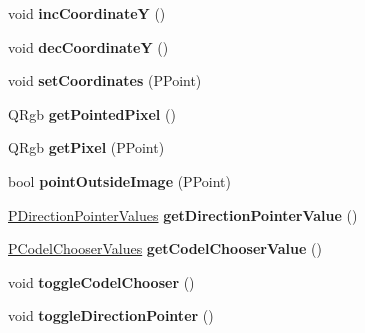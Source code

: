 \begin{CompactItemize}
\item 
\hypertarget{classPCodePointer_58c15d4d1abb1fb971170f19c3b9e8cf}{
void \textbf{incCoordinateY} ()}
\label{classPCodePointer_58c15d4d1abb1fb971170f19c3b9e8cf}

\item 
\hypertarget{classPCodePointer_cc8b95bb3786748c1aff41eed6d299e1}{
void \textbf{decCoordinateY} ()}
\label{classPCodePointer_cc8b95bb3786748c1aff41eed6d299e1}

\item 
\hypertarget{classPCodePointer_117bf9322b4fdcb189c41a6f2f113a4b}{
void \textbf{setCoordinates} (PPoint)}
\label{classPCodePointer_117bf9322b4fdcb189c41a6f2f113a4b}

\item 
\hypertarget{classPCodePointer_6544ee43112dcafb5fc7c865ced682f0}{
QRgb \textbf{getPointedPixel} ()}
\label{classPCodePointer_6544ee43112dcafb5fc7c865ced682f0}

\item 
\hypertarget{classPCodePointer_e9f3396a98b84d090e820ad37c6dca21}{
QRgb \textbf{getPixel} (PPoint)}
\label{classPCodePointer_e9f3396a98b84d090e820ad37c6dca21}

\item 
\hypertarget{classPCodePointer_a9e836354b61f96ed39208c8b37d57d3}{
bool \textbf{pointOutsideImage} (PPoint)}
\label{classPCodePointer_a9e836354b61f96ed39208c8b37d57d3}

\item 
\hypertarget{classPCodePointer_e0461a3d72af876b5b3c838a8b45a729}{
\hyperlink{penums_8h_6d3256570150238c718cbbb5f81c82df}{PDirectionPointerValues} \textbf{getDirectionPointerValue} ()}
\label{classPCodePointer_e0461a3d72af876b5b3c838a8b45a729}

\item 
\hypertarget{classPCodePointer_529b0f2f65c1d17082d755813fec0194}{
\hyperlink{penums_8h_59dc57d526e2ce263bdf851c0d4fef3e}{PCodelChooserValues} \textbf{getCodelChooserValue} ()}
\label{classPCodePointer_529b0f2f65c1d17082d755813fec0194}

\item 
\hypertarget{classPCodePointer_56d2ef632779fbe64937030e82b027d1}{
void \textbf{toggleCodelChooser} ()}
\label{classPCodePointer_56d2ef632779fbe64937030e82b027d1}

\item 
\hypertarget{classPCodePointer_4aab1f30e01bb0fb3d78b5e6aa93535c}{
void \textbf{toggleDirectionPointer} ()}
\label{classPCodePointer_4aab1f30e01bb0fb3d78b5e6aa93535c}


\end{CompactItemize}
